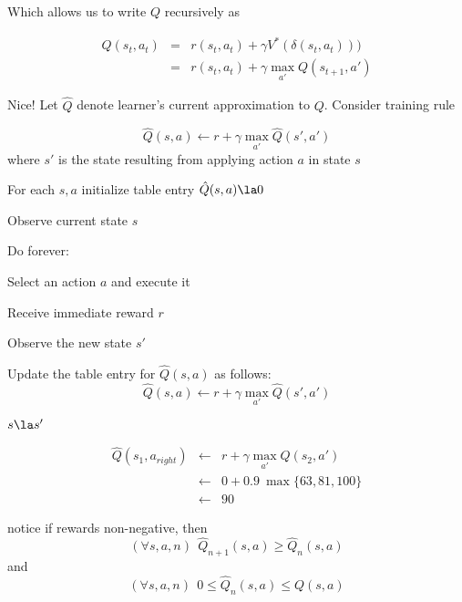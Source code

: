 Which allows us to write $Q$ recursively as

\begin{eqnarray}
Q(s_t,a_t) &= &  r(s_t,a_t) + \gamma V^{*}(\delta(s_t,a_t))) \nonumber \\
 &= &  r(s_t,a_t) + \gamma \max_{a'}Q(s_{t+1},a') \nonumber
\end{eqnarray}

Nice!  Let $\hat{Q}$ denote learner's current approximation to $Q$.  Consider
training rule

\[ \hat{Q}(s,a) \leftarrow r + \gamma \max_{a'}\hat{Q}(s',a') \]
\noindent
where $s'$ is the state resulting from applying action $a$ in state $s$


 \bk

For each $s, a$ initialize table entry $\hat{Q}(s,a) \la 0$
 
\bigskip

Observe current state $s$

\bigskip

Do forever:
\bi
\item Select an action $a$ and execute it

\item Receive immediate reward $r$

\item Observe the new state $s'$

\item Update the table entry for $\hat{Q}(s,a)$ as follows:
\begin{displaymath}
\hat{Q}(s,a) \leftarrow r + \gamma \max_{a'}\hat{Q}(s',a') 
\end{displaymath}

\item $s \la s'$
\ei


 \bk
\centerline{\hbox{}}

\begin{eqnarray}
\hat{Q}(s_1,a_{right}) & \leftarrow & r + \gamma \max_{a'}\hat{Q}(s_2,a') \nonumber \\
 & \leftarrow & 0 + 0.9 \ \max \{63, 81, 100 \} \nonumber \\ & \leftarrow & 90
 \nonumber
\end{eqnarray}

\bigskip
notice if rewards non-negative, then
\[(\forall s,a,n)\ \ \hat{Q}_{n+1}(s,a) \geq \hat{Q}_{n}(s,a) \]
and 
\[(\forall s,a,n)\ \  0 \leq \hat{Q}_n(s,a) \leq Q(s,a) \]


